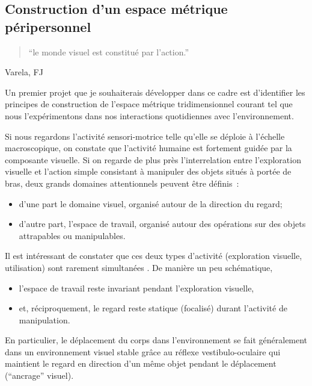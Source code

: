 \documentclass[11pt]{article}
\begin{document}
\subsection{Construction d'un espace métrique péripersonnel}

\begin{quotation}
	``le monde visuel est constitué par l'action.''
	
\end{quotation}
\begin{flushright}
	Varela, FJ
\end{flushright}	

Un premier projet que je souhaiterais développer dans ce cadre est d'identifier les principes de construction de l'espace métrique tridimensionnel courant
tel que nous l'expérimentons dans nos interactions quotidiennes avec l'environnement. 

Si nous regardons l'activité sensori-motrice telle qu'elle se déploie à l'échelle macroscopique, on constate que l'activité humaine est fortement guidée par la composante visuelle.
Si on regarde de plus près l'interrelation entre l'exploration visuelle et
l'action simple consistant à manipuler des objets situés à portée de bras,
deux grands domaines attentionnels peuvent être définis~:
\begin{itemize}
	\item d'une part 
	le domaine visuel, organisé autour de la direction du regard;
	\item d'autre part,
	l'espace de travail, organisé autour des opérations sur des objets
	attrapables ou manipulables. 
\end{itemize} 
Il est intéressant de
constater que ces deux types d'activité (exploration visuelle, utilisation) sont rarement
simultanées  . De manière un peu schématique, 
\begin{itemize}
	\item l'espace de travail reste invariant pendant
	l'exploration visuelle, 
	\item et, réciproquement, le regard reste statique (focalisé) durant
	l'activité de manipulation.
\end{itemize}
En particulier, le déplacement du corps dans l'environnement se fait généralement
dans un environnement visuel stable grâce au réflexe vestibulo-oculaire qui maintient le regard
en direction d'un même objet pendant le déplacement (``ancrage'' visuel).
\end{document}
